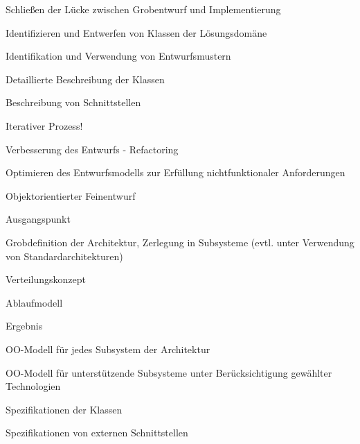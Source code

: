 \documentclass[a4paper]{article}
\begin{document}
\begin{multicols}{3}
  Schließen der Lücke zwischen Grobentwurf und Implementierung
  \begin{itemize*}
    \item Identifizieren und Entwerfen von Klassen der Lösungsdomäne
    \item Identifikation und Verwendung von Entwurfsmustern
    \item Detaillierte Beschreibung der Klassen
    \item Beschreibung von Schnittstellen
    \item Iterativer Prozess!
    \begin{itemize*}
      \item Verbesserung des Entwurfs - Refactoring
      \item Optimieren des Entwurfsmodells zur Erfüllung nichtfunktionaler Anforderungen
    \end{itemize*}
  \end{itemize*}

  Objektorientierter Feinentwurf
  \begin{itemize*}
    \item Ausgangspunkt
    \begin{itemize*}
      \item Grobdefinition der Architektur, Zerlegung in Subsysteme (evtl. unter Verwendung von Standardarchitekturen)
      \item Verteilungskonzept
      \item Ablaufmodell
    \end{itemize*}
    \item Ergebnis
    \begin{itemize*}
      \item OO-Modell für jedes Subsystem der Architektur
      \item OO-Modell für unterstützende Subsysteme unter Berücksichtigung gewählter Technologien
      \item Spezifikationen der Klassen
      \item Spezifikationen von externen Schnittstellen
    \end{itemize*}
  \end{itemize*}


\end{multicols}
\end{document}
